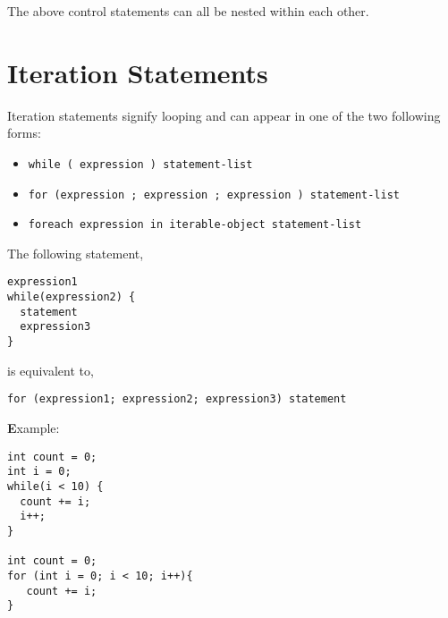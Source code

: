 \documentclass{book}
\begin{document}
The above control statements can all be nested within each other.


\section{Iteration Statements} %
\label{sec:iteration_statements}

Iteration statements signify looping and can appear in one of the two following
forms:

\begin{itemize}
  \item[] \tt while ( expression ) statement-list \rm
  \item[] \tt for (expression ; expression ; expression ) statement-list \rm
  \item[] \tt foreach expression in iterable-object statement-list \rm
\end{itemize}

The following statement,

\begin{verbatim}
expression1
while(expression2) {
  statement
  expression3
}
\end{verbatim}

is equivalent to,

\begin{verbatim}
for (expression1; expression2; expression3) statement
\end{verbatim}

\textbf Example:

\begin{verbatim}                                                                                                                     
int count = 0;
int i = 0;                                                                                                                      
while(i < 10) {                                                                                                                
  count += i;                                                                                                            
  i++;                                                                                                                        
}

int count = 0;
for (int i = 0; i < 10; i++){ 
   count += i;
}                                                                                                                                    
\end{verbatim}
\end{document}
